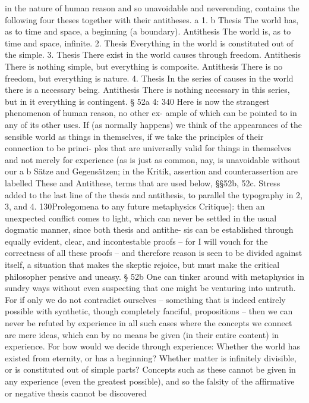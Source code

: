 in the nature of human reason and so unavoidable and neverending,
contains the following four theses together with their antitheses. a
1. b
Thesis
The world has, as to time and space,
a beginning (a boundary).
Antithesis
The world is, as to time and space,
inﬁnite.
2.
Thesis
Everything in the world
is constituted out of the
simple. 3.
Thesis
There exist in the world
causes through
freedom.
Antithesis
There is nothing simple,
but everything is
composite. Antithesis
There is no freedom,
but everything is
nature.
4.
Thesis
In the series of causes in the world there is a
necessary being.
Antithesis
There is nothing necessary in this series, but in it
everything is contingent.
§ 52a
4: 340
Here is now the strangest phenomenon of human reason, no other ex-
ample of which can be pointed to in any of its other uses. If (as normally
happens) we think of the appearances of the sensible world as things in
themselves, if we take the principles of their connection to be princi-
ples that are universally valid for things in themselves and not merely
for experience (as is just as common, nay, is unavoidable without our
a
b
Sätze and Gegensätzen; in the Kritik, assertion and counterassertion are labelled These and
Antithese, terms that are used below, §§52b, 52c.
Stress added to the last line of the thesis and antithesis, to parallel the typography in 2,
3, and 4.
130Prolegomena to any future metaphysics
Critique): then an unexpected conﬂict comes to light, which can never
be settled in the usual dogmatic manner, since both thesis and antithe-
sis can be established through equally evident, clear, and incontestable
proofs – for I will vouch for the correctness of all these proofs – and
therefore reason is seen to be divided against itself, a situation that makes
the skeptic rejoice, but must make the critical philosopher pensive and
uneasy.
§ 52b
One can tinker around with metaphysics in sundry ways without even
suspecting that one might be venturing into untruth. For if only we do
not contradict ourselves – something that is indeed entirely possible with
synthetic, though completely fanciful, propositions – then we can never
be refuted by experience in all such cases where the concepts we connect
are mere ideas, which can by no means be given (in their entire content) in
experience. For how would we decide through experience: Whether the
world has existed from eternity, or has a beginning? Whether matter is
inﬁnitely divisible, or is constituted out of simple parts? Concepts such as
these cannot be given in any experience (even the greatest possible), and
so the falsity of the afﬁrmative or negative thesis cannot be discovered
